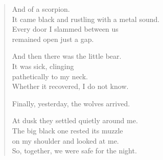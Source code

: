{\begin{verse}
And of a scorpion.\\
It came black and rustling with a metal sound.\\
Every door I slammed between us\\
remained open just a gap.

And then there was the little bear.\\
It was sick, clinging\\
pathetically to my neck.\\
Whether it recovered, I do not know.

Finally, yesterday, the wolves arrived.

At dusk they settled quietly around me.\\
The big black one rested its muzzle\\
on my shoulder and looked at me.\\
So, together, we were safe for the night.
\end{verse}

}

